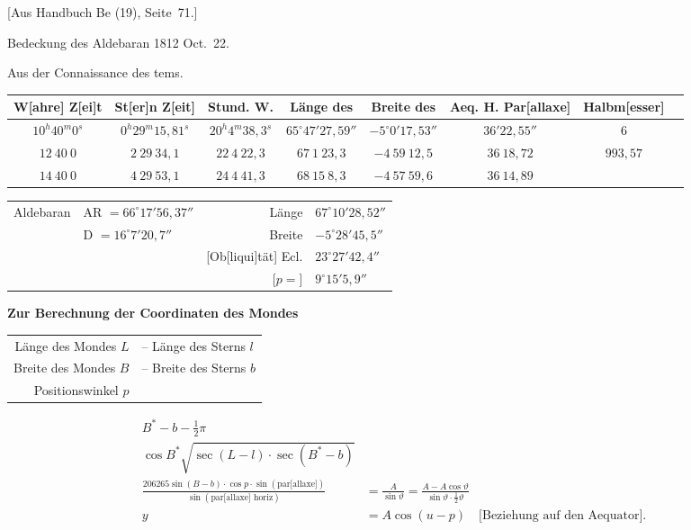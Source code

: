 \documentclass[12pt,a4paper]{article}
\theoremstyle{plain}
\theoremstyle{definition}
\theoremstyle{remark}
\begin{document}
[Aus Handbuch Be (19), Seite~71.]

Bedeckung des Aldebaran 1812 Oct.~22.

Aus der Connaissance des tems.

\begin{center}
\begin{tabular}{c|c|c|c|c|c|c|c}
W[ahre] Z[ei]t & St[er]n Z[eit] & Stund. W. & L\"ange des & Breite des & Aeq. H. Par[allaxe] & Halbm[esser] \\
\hline
$10^h40^m0^s$ & $0^h29^m15{,}81^s$ & $20^h4^m38{,}3^s$ & $65^{\circ}47'27{,}59''$ & $-5^{\circ}0'17{,}53''$ & $36'22{,}55''$ & $6$ \\
$12\ 40\ 0$ & $2\ 29\ 34{,}1$ & $22\ 4\ 22{,}3$ & $67\ 1\ 23{,}3$ & $-4\ 59\ 12{,}5$ & $36\ 18{,}72$ & $993{,}57$ \\
$14\ 40\ 0$ & $4\ 29\ 53{,}1$ & $24\ 4\ 41{,}3$ & $68\ 15\ 8{,}3$ & $-4\ 57\ 59{,}6$ & $36\ 14{,}89$ &
\end{tabular}
\end{center}

\begin{center}
\begin{tabular}{r@{ $=$ }l@{\quad}r@{ $=$ }l}
Aldebaran & AR $= 66^{\circ}17'56{,}37''$ & L\"ange & $67^{\circ}10'28{,}52''$ \\
& D $= 16^{\circ}7'20{,}7''$ & Breite & $-5^{\circ}28'45{,}5''$ \\
& & [Ob[liqui]t\"at] Ecl. & $23^{\circ}27'42{,}4''$ \\
& & [$p=$] & $9^{\circ}15'5{,}9''$
\end{tabular}
\end{center}

\textbf{Zur Berechnung der Coordinaten des Mondes}

\begin{center}
\begin{tabular}{r@{ $=$ }l}
L\"ange des Mondes $L$ & -- L\"ange des Sterns $l$ \\
Breite des Mondes $B$ & -- Breite des Sterns $b$ \\
Positionswinkel $p$
\end{tabular}
\end{center}

\begin{align}
B^* - b - \tfrac{1}{2}\pi \\
\cos B^* \sqrt{\sec(L-l) \cdot \sec(B^* - b)} \\
\tfrac{206265 \sin(B-b) \cdot \cos p \cdot \sin(\text{par[allaxe]})}{\sin(\text{par[allaxe] horiz})} &= \tfrac{A}{\sin\vartheta} = \tfrac{A - A\cos\vartheta}{\sin\vartheta \cdot \tfrac{1}{2}\vartheta} \\
y &= A\cos(u - p) \quad \text{[Beziehung auf den Aequator].}
\end{align}
\end{document}
